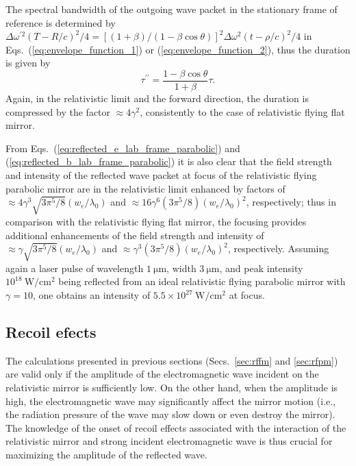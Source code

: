 \documentclass[10pt, a4paper, twoside, openright]{report}
\begin{document}
The spectral bandwidth of the outgoing wave packet in the stationary frame of reference is determined by $ \Delta \omega^{\prime 2} \left( T - R / c \right)^2 / 4 = \left[ \left( 1 + \beta \right) / \left( 1 - \beta \cos \theta \right) \right]^2 \Delta \omega^2 \left( t - \rho / c \right)^2 / 4 $ in Eqs.~(\ref{eq:envelope_function_1}) or (\ref{eq:envelope_function_2}), thus the duration is given by
\begin{equation}\label{key}
	\tau^{\prime \prime} = \frac{1 - \beta \cos \theta}{1 + \beta} \tau.
\end{equation}
Again, in the relativistic limit and the forward direction, the duration is compressed by the factor $ \approx 4 \gamma^2 $, consistently to the case of relativistic flying flat mirror.

From Eqs.~(\ref{eq:reflected_e_lab_frame_parabolic}) and (\ref{eq:reflected_b_lab_frame_parabolic}) it is also clear that the field strength and intensity of the reflected wave packet at focus of the relativistic flying parabolic mirror are in the relativistic limit enhanced by factors of $ \approx 4 \gamma^3 \sqrt{3 \pi^5 / 8} \left( w_e / \lambda_0 \right) $ and $ \approx 16 \gamma^6 \left( 3 \pi^5 / 8 \right) \left( w_e / \lambda_0 \right)^2 $, respectively; thus in comparison with the relativistic flying flat mirror, the focusing provides additional enhancements of the field strength and intensity of $ \approx \gamma \sqrt{3 \pi^5 / 8} \left( w_e / \lambda_0 \right) $ and $ \approx \gamma^3 \left( 3 \pi^5 / 8 \right) \left( w_e / \lambda_0 \right)^2 $, respectively. Assuming again a laser pulse of wavelength $ 1 \ \mathrm{\mu m} $, width $ 3 \ \mathrm{\mu m} $, and peak intensity $ 10^{18} \ \mathrm{W / cm^2} $ being reflected from an ideal relativistic flying parabolic mirror with $ \gamma = 10 $, one obtains an intensity of $ 5.5 \times 10^{27} \ \mathrm{W / cm^2} $ at focus.

\subsection{Recoil efects}

The calculations presented in previous sections (Secs.~\ref{sec:rffm} and \ref{sec:rfpm}) are valid only if the amplitude of the electromagnetic wave incident on the relativistic mirror is sufficiently low. On the other hand, when the amplitude is high, the electromagnetic wave may significantly affect the mirror motion (i.e., the radiation pressure of the wave may slow down or even destroy the mirror). The knowledge of the onset of recoil effects associated with the interaction of the relativistic mirror and strong incident electromagnetic wave is thus crucial for maximizing the amplitude of the reflected wave.
\end{document}
